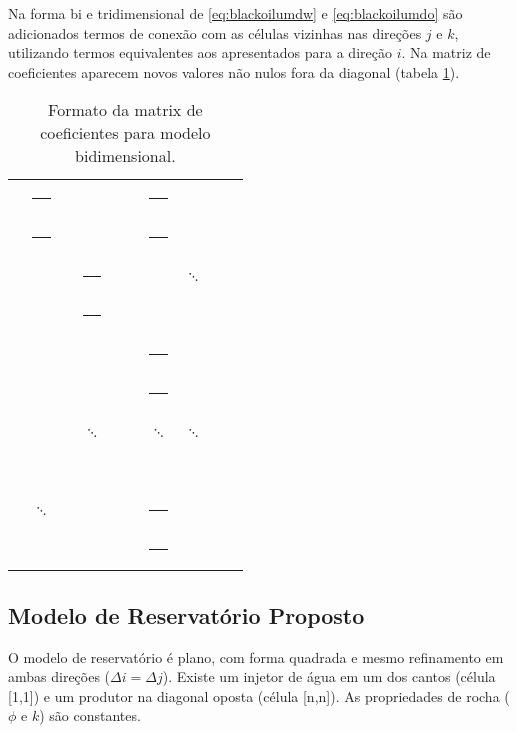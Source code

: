 \documentclass[final,5p]{elsarticle}
\numberwithin{equation}{section}
\newcommand*{\squareb}{\textcolor{black}{\rule{0.5em}{0.5em}}}
\newcommand*{\squareg}{\textcolor{gray}{\rule{0.5em}{0.5em}}}
\begin{document}
        Na forma bi e tridimensional de \ref{eq:blackoilumdw} e \ref{eq:blackoilumdo} são adicionados termos de conexão com as células vizinhas nas direções $j$ e $k$, utilizando termos equivalentes aos apresentados para a direção $i$. Na matriz de coeficientes aparecem novos valores não nulos fora da diagonal (tabela \ref{tab:bidimensional}).
        \begin{table}
            \centering
            \caption{Formato da matrix de coeficientes para modelo bidimensional.}
            \label{tab:bidimensional}
            \bigskip
            \renewcommand{\arraystretch}{0.8}
            \begin{tabularx}{0.35\textwidth}{|XXXXXXXXXX|}
                \squareb & \squareb & \squareg &          &          &          & \squareg &          &          &          \\
                \squareb & \squareb & \squareg &          &          &          & \squareg &          &          &          \\
                \squareg &          & \squareb & \squareb & \squareg &          &          & $\ddots$ &          &          \\
                \squareg &          & \squareb & \squareb & \squareg &          &          &          &          &          \\
                         &          & \squareg &          & \squareb & \squareb & \squareg &          &          &          \\
                         &          & \squareg &          & \squareb & \squareb & \squareg &          &          &          \\
                \squareg &          &          & $\ddots$ &          &          & $\ddots$ & $\ddots$ &          &          \\
                \squareg &          &          &          &          &          &          &          &          &          \\
                         & $\ddots$ &          &          &          &          & \squareg &          & \squareb & \squareb \\
                         &          &          &          &          &          & \squareg &          & \squareb & \squareb \\
            \end{tabularx}
        \end{table}

        \subsection{Modelo de Reservatório Proposto}
            O modelo de reservatório é plano, com forma quadrada e mesmo refinamento em ambas direções ($\Delta i = \Delta j$). Existe um injetor de água em um dos cantos (célula [1,1]) e um produtor na diagonal oposta (célula [n,n]). As propriedades de rocha ($\phi$ e $k$) são constantes.
\end{document}
